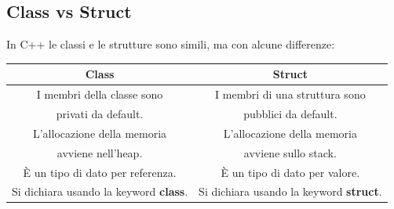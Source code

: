 \subsection{Class vs Struct}

\textsf{\small In C++ le classi e le strutture sono simili, ma con alcune differenze:} \break

\begin{tabular}{|c|c|}
	\hline
	\textbf{Class} & \textbf{Struct} \\
	\hline
	\textsf{\small I membri della classe sono } & \textsf{\small I membri di una struttura sono } \\
	\textsf{\small privati da default.} & \textsf{\small pubblici da default.} \\
	\hline
	\textsf{\small L'allocazione della memoria } & \textsf{\small L'allocazione della memoria } \\
	\textsf{\small avviene nell'heap.} & \textsf{\small avviene sullo stack.} \\
	\hline
	\textsf{\small È un tipo di dato per referenza.} & \textsf{\small È un tipo di dato per valore.} \\
	\hline
	\textsf{\small Si dichiara usando la keyword \textbf{class}.} & \textsf{\small Si dichiara usando la keyword \textbf{struct}.} \\
	\hline
\end{tabular}


